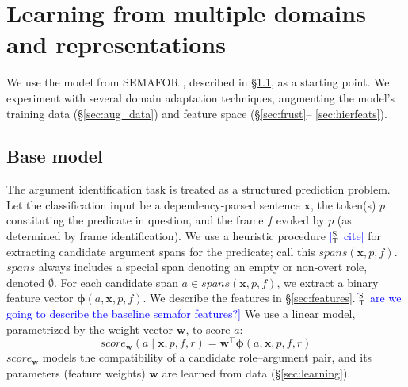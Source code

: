 \documentclass[11pt,a4paper]{article}
\newcommand{\ensuretext}[1]{#1}
\newcommand{\stmarker}{\ensuretext{\textcolor{blue}{\ensuremath{^{\textsc{S}}_{\textsc{T}}}}}}
\newcommand{\arkcomment}[3]{\ensuretext{\textcolor{#3}{[#1 #2]}}}
\newcommand{\st}[1]{\arkcomment{\stmarker}{#1}{blue}}
\begin{document}
\section{Learning from multiple domains and representations}

We use the model from SEMAFOR \citep{das-14}, described in \S\ref{sec:base_model}, as a starting point.
We experiment with several domain adaptation techniques, augmenting the model's training data (\S\ref{sec:aug_data}) and feature space %
(\S\ref{sec:frust}--%
\ref{sec:hierfeats}).


\subsection{Base model}
\label{sec:base_model}

The argument identification task is treated as a structured prediction problem.
Let the classification input be a dependency-parsed sentence $\mathbf{x}$, 
the token(s) $p$ constituting the predicate in question, and the frame $f$ evoked by $p$
(as determined by frame identification). 
We use a heuristic procedure \st{cite} for extracting candidate argument spans 
for the predicate; call this $\textit{spans}(\mathbf{x}, p, f)$.
$\textit{spans}$ always includes a special span denoting an empty or non-overt role, denoted $\emptyset$. 
For each candidate span $a \in \textit{spans}(\mathbf{x}, p, f)$, we extract a binary feature vector 
$\mathbf{\phi}(a, \mathbf{x}, p, f)$.
We describe the features in \S\ref{sec:features}.\st{are we going to describe the baseline semafor features?}
We use a linear model, parametrized by the weight vector $\mathbf{w}$, to score $a$:
\begin{equation}
\textit{score}_\mathbf{w}(a \mid \mathbf{x}, p, f, r) = \mathbf{w}^\top \mathbf{\phi}(a, \mathbf{x}, p, f, r)
\end{equation}
$\textit{score}_\mathbf{w}$ models the compatibility  of a candidate
role--argument pair, and its parameters (feature weights) $\mathbf{w}$ are
learned from data (\S\ref{sec:learning}).
\end{document}

